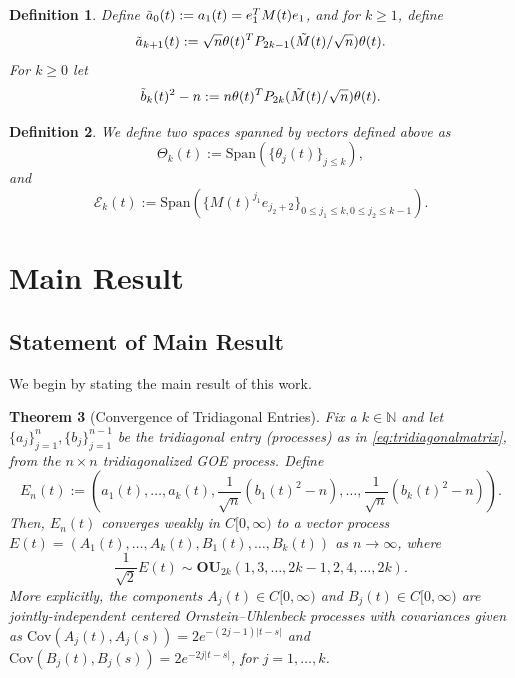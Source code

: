 \documentclass{amsart}
\newtheorem{thm}{Theorem}[section]
\newtheorem{defn}[thm]{Definition}
\numberwithin{equation}{section}
\begin{document}
\begin{defn}\label{Def of approximate Tridiagonal Entries}
    Define $\Tilde{a}_0(t):=a_1(t)=e_1^TM(t)e_1$, and for $k\geq 1$, define 
    \begin{equation*}
        \Tilde{a}_{k+1}(t):=\sqrt{n}\theta(t)^T P_{2k-1}(\Tilde{M}(t)/\sqrt{n})\theta(t).
    \end{equation*}
    For $k \geq 0$ let 
    \begin{equation*}
        \Tilde{b}_k(t)^2-n:=n\theta(t)^T P_{2k}(\Tilde{M}(t)/\sqrt{n})\theta(t).
    \end{equation*}
\end{defn}

\begin{defn}
    We define two spaces spanned by vectors defined above as
    \begin{equation}
        \Theta_k(t):=\mathrm{Span}(\{\theta_j(t)\}_{j\leq k}),
    \end{equation}
    and
    \begin{equation}
        \mathcal{E}_k(t):= \mathrm{Span}(\{M(t)^{j_1}e_{j_2+2}\}_{0 \leq j_1 \leq k, 0 \leq j_2 \leq k-1}).
    \end{equation}
\end{defn}


\section{Main Result}\label{sec:mainresult}



\subsection{Statement of Main Result}
We begin by stating the main result of this work. 
\begin{thm}[Convergence of Tridiagonal Entries]\label{Main Theorem Statement} 
Fix a $k \in \mathbb{N}$ and let $\{a_j\}_{j=1}^n, \{b_j\}_{j=1}^{n-1}$ be the tridiagonal entry (processes) as in \eqref{eq:tridiagonalmatrix}, from the $n\times n$ tridiagonalized GOE process. Define 
\begin{equation*}
E_n(t):=\left(a_1(t),\dots, a_k(t), \frac{1}{\sqrt{n}}(b_1(t)^2-n),\dots ,\frac{1}{\sqrt{n}}(b_k(t)^2-n)\right).
\end{equation*} 
Then, $E_n(t)$ converges weakly in $C[0,\infty)$ to a vector process $E(t)=(A_1(t),\dots,A_k(t),B_1(t),\dots,B_k(t))$ as $n\to\infty$, where
\begin{equation*}
    \frac{1}{\sqrt{2}}E(t) \sim \mathbf{OU}_{2k}(1,3,\dots,2k-1,2,4,\dots,2k).
\end{equation*} 
More explicitly, the components $A_j(t) \in C[0,\infty)$ and $B_j(t) \in C[0,\infty)$ are jointly-independent centered Ornstein--Uhlenbeck processes with covariances given as $\mathrm{Cov}(A_j(t),A_j(s))=2e^{-(2j-1)|t-s|}$ and $\mathrm{Cov}(B_j(t),B_j(s))=2e^{-2j|t-s|}$, for $j=1,\dots,k$.
\end{thm}
\end{document}
